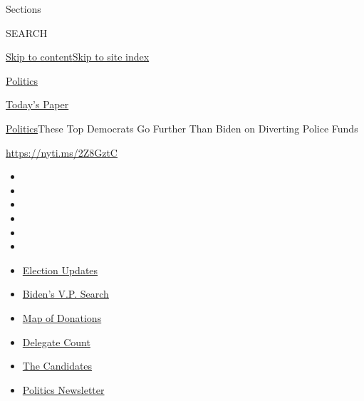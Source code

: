 Sections

SEARCH

\protect\hyperlink{site-content}{Skip to
content}\protect\hyperlink{site-index}{Skip to site index}

\href{https://www.nytimes3xbfgragh.onion/section/politics}{Politics}

\href{https://myaccount.nytimes3xbfgragh.onion/auth/login?response_type=cookie\&client_id=vi}{}

\href{https://www.nytimes3xbfgragh.onion/section/todayspaper}{Today's
Paper}

\href{/section/politics}{Politics}\textbar{}These Top Democrats Go
Further Than Biden on Diverting Police Funds

\url{https://nyti.ms/2Z8GztC}

\begin{itemize}
\item
\item
\item
\item
\item
\item
\end{itemize}

\begin{itemize}
\item
  \href{https://www.nytimes3xbfgragh.onion/2020/08/04/us/elections/primary-election-michigan-arizona-kansas.html?action=click\&pgtype=Article\&state=default\&region=TOP_BANNER\&context=storylines_menu}{Election
  Updates}
\item
  \href{https://www.nytimes3xbfgragh.onion/article/biden-vice-president-2020.html?action=click\&pgtype=Article\&state=default\&region=TOP_BANNER\&context=storylines_menu}{Biden's
  V.P. Search}
\item
  \href{https://www.nytimes3xbfgragh.onion/interactive/2020/07/24/us/politics/trump-biden-campaign-donors.html?action=click\&pgtype=Article\&state=default\&region=TOP_BANNER\&context=storylines_menu}{Map
  of Donations}
\item
  \href{https://www.nytimes3xbfgragh.onion/interactive/2020/us/elections/delegate-count-primary-results.html?action=click\&pgtype=Article\&state=default\&region=TOP_BANNER\&context=storylines_menu}{Delegate
  Count}
\item
  \href{https://www.nytimes3xbfgragh.onion/interactive/2019/us/politics/2020-presidential-candidates.html?action=click\&pgtype=Article\&state=default\&region=TOP_BANNER\&context=storylines_menu}{The
  Candidates}
\item
  \href{https://www.nytimes3xbfgragh.onion/newsletters/politics?action=click\&pgtype=Article\&state=default\&region=TOP_BANNER\&context=storylines_menu}{Politics
  Newsletter}
\end{itemize}

